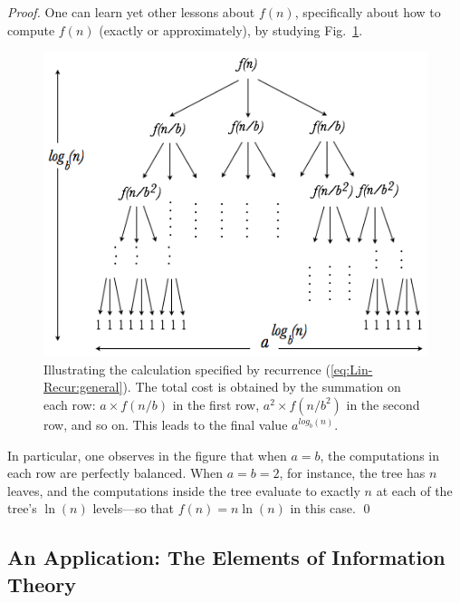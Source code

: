 \begin{proof}
One can learn yet other lessons about $f(n)$, specifically about how to compute $f(n)$ (exactly or approximately), by studying Fig.~\ref{fig:masterTheorem}.
\begin{figure}[htb]
\begin{center}
       \includegraphics[scale=0.4]{FiguresMaths/MasterTheoremgeneral}
\caption{Illustrating the calculation specified by recurrence (\ref{eq:Lin-Recur:general}).  The total cost is obtained by the summation on each row: $a \times f(n/b)$ in the first row, $a^2 \times f(n/b^2)$ in the second row, and so on.  This leads to the final value $a^{log_b(n)}$.
\label{fig:masterTheorem}}
\end{center}
\end{figure}
In particular, one observes in the figure that when $a=b$, the computations in each row are perfectly balanced.  When $a=b=2$, for instance, the tree has $n$ leaves, and the computations inside the tree evaluate to exactly $n$ at each of the tree's $ \ln(n)$ levels---so that $f(n) = n \ln(n)$ in this case.  \qed
\end{proof}


\subsection{An Application: The Elements of Information Theory}
\label{sec:count-strings}

